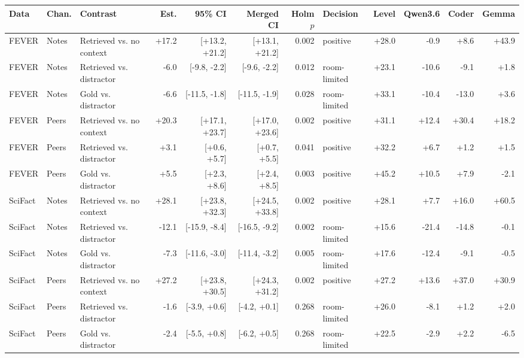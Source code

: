 \begin{tabular}{lllrrrrlrrrr}
\toprule
Data & Chan. & Contrast & Est. & 95\% CI & Merged CI & Holm $p$ & Decision & Level & Qwen3.6 & Coder & Gemma \\
\midrule
FEVER & Notes & Retrieved vs. no context & +17.2 & [+13.2, +21.2] & [+13.1, +21.2] & 0.002 & positive & +28.0 & -0.9 & +8.6 & +43.9 \\
FEVER & Notes & Retrieved vs. distractor & -6.0 & [-9.8, -2.2] & [-9.6, -2.2] & 0.012 & room-limited & +23.1 & -10.6 & -9.1 & +1.8 \\
FEVER & Notes & Gold vs. distractor & -6.6 & [-11.5, -1.8] & [-11.5, -1.9] & 0.028 & room-limited & +33.1 & -10.4 & -13.0 & +3.6 \\
FEVER & Peers & Retrieved vs. no context & +20.3 & [+17.1, +23.7] & [+17.0, +23.6] & 0.002 & positive & +31.1 & +12.4 & +30.4 & +18.2 \\
FEVER & Peers & Retrieved vs. distractor & +3.1 & [+0.6, +5.7] & [+0.7, +5.5] & 0.041 & positive & +32.2 & +6.7 & +1.2 & +1.5 \\
FEVER & Peers & Gold vs. distractor & +5.5 & [+2.3, +8.6] & [+2.4, +8.5] & 0.003 & positive & +45.2 & +10.5 & +7.9 & -2.1 \\
SciFact & Notes & Retrieved vs. no context & +28.1 & [+23.8, +32.3] & [+24.5, +33.8] & 0.002 & positive & +28.1 & +7.7 & +16.0 & +60.5 \\
SciFact & Notes & Retrieved vs. distractor & -12.1 & [-15.9, -8.4] & [-16.5, -9.2] & 0.002 & room-limited & +15.6 & -21.4 & -14.8 & -0.1 \\
SciFact & Notes & Gold vs. distractor & -7.3 & [-11.6, -3.0] & [-11.4, -3.2] & 0.005 & room-limited & +17.6 & -12.4 & -9.1 & -0.5 \\
SciFact & Peers & Retrieved vs. no context & +27.2 & [+23.8, +30.5] & [+24.3, +31.2] & 0.002 & positive & +27.2 & +13.6 & +37.0 & +30.9 \\
SciFact & Peers & Retrieved vs. distractor & -1.6 & [-3.9, +0.6] & [-4.2, +0.1] & 0.268 & room-limited & +26.0 & -8.1 & +1.2 & +2.0 \\
SciFact & Peers & Gold vs. distractor & -2.4 & [-5.5, +0.8] & [-6.2, +0.5] & 0.268 & room-limited & +22.5 & -2.9 & +2.2 & -6.5 \\
\bottomrule
\end{tabular}
